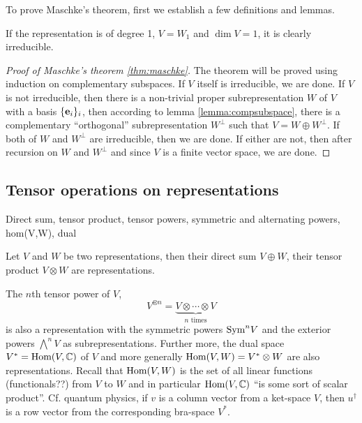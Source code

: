 		To prove Maschke's theorem, first we establish a few definitions and lemmas.
		
		\begin{corollary}
			If the representation is of degree 1, $V = W_1$ and $\dim V = 1$, it is clearly irreducible.
		\end{corollary}
		
		\begin{proof}[Proof of Maschke's theorem \ref{thm:maschke}]
			The theorem will be proved using induction on complementary subspaces. If $V$ itself is irreducible, we are done. If $V$ is not irreducible, then there is a non-trivial proper subrepresentation $W$ of $V$ with a basis $\{\mathbf{e}_i\}_i$, then according to lemma \ref{lemma:compsubspace}, there is a complementary ``orthogonal'' subrepresentation $W^\perp$ such that $V = W \oplus W^\perp$. If both of $W$ and $W^\perp$ are irreducible, then we are done. If either are not, then after recursion on $W$ and $W^\perp$ and since $V$ is a finite vector space, we are done.
		\end{proof}
	
	\subsection{Tensor operations on representations}
	
	Direct sum, tensor product, tensor powers, symmetric and alternating powers, hom(V,W), dual
	
	Let $V$ and $W$ be two representations, then their direct sum $V \oplus W$, their tensor product $V \otimes W$ are representations.
	
	The $n$th tensor power of $V$, \[V^{\otimes n} = \underset{n \text{ times}}{\underbrace{V \otimes \cdots \otimes V}}\] is also a representation with the symmetric powers $\text{Sym}^n V$ and the exterior powers $ \bigwedge^n V$ as subrepresentations. Further more, the dual space $V^* = \text{Hom}(V,\mathbb{C})$ of $V$ and more generally $\text{Hom}(V,W) = V^* \otimes W$ are also representations. Recall that $\text{Hom}(V,W)$ is the set of all linear functions (functionals??) from $V$ to $W$ and in particular $\text{Hom}(V, \mathbb{C})$ ``is some sort of scalar product''. Cf. quantum physics, if $v$ is a column vector from a ket-space $V$, then $u^\dagger$ is a row vector from the corresponding bra-space $V^*$.
	
	